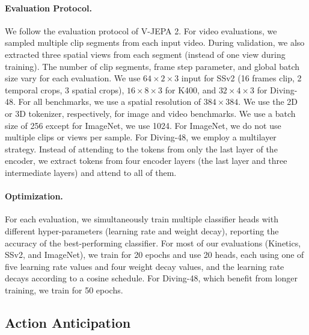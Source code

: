 \documentclass[]{fairmeta}
\begin{document}
\paragraph{\bf Evaluation Protocol.} We follow the evaluation protocol of V-JEPA 2. For video evaluations, we sampled multiple clip segments from each input video. During validation, we also extracted three spatial views from each segment (instead of one view during training). The number of clip segments, frame step parameter, and global batch size vary for each evaluation. We use $64 \times 2 \times 3$ input for SSv2 (16 frames clip, 2 temporal crops, 3 spatial crops), $16 \times 8 \times 3$ for K400, and $32 \times 4 \times 3$ for Diving-48. For all benchmarks, we use a spatial resolution of $384 \times 384$. We use the 2D or 3D tokenizer, respectively, for image and video benchmarks. We use a batch size of 256 except for ImageNet, we use 1024. For ImageNet, we do not use multiple clips or views per sample. For Diving-48, we employ a multilayer strategy. Instead of attending to the tokens from only the last layer of the encoder, we extract tokens from four encoder layers (the last layer and three intermediate layers) and attend to all of them.

\paragraph{\bf Optimization.} For each evaluation, we simultaneously train multiple classifier heads with different hyper-parameters (learning rate and weight decay), reporting the accuracy of the best-performing classifier. For most of our evaluations (Kinetics, SSv2, and ImageNet), we train for 20 epochs and use 20 heads, each
using one of five learning rate values and four weight decay values, and the learning rate decays according to a cosine schedule. For Diving-48, which benefit from longer training, we train for 50 epochs.


\subsection{Action Anticipation}
\end{document}
